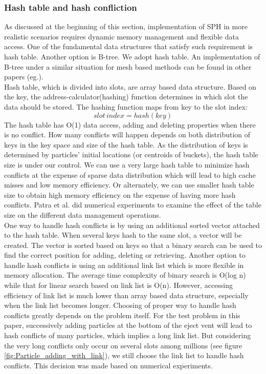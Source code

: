 \documentclass[conference,compsoc]{IEEEtran}
\begin{document}
\subsubsection{Hash table and hash confliction}
As discussed at the beginning of this section, implementation of SPH in more realistic scenarios requires dynamic memory management and flexible data access. One of the fundamental data structures that satisfy such requirement is hash table. Another option is B-tree. We adopt hash table. An implementation of B-tree under a similar situation for mesh based methods can be found in other papers (eg.\cite{patra2003data}).\\
Hash table, which is divided into slots, are array based data structure. Based on the key, the address-calculator(hashing) function determines in which slot the data should be stored. The hashing function maps from key to the slot index:
\begin{equation}
slot\,index = hash(key)
\end{equation}
The hash table has O(1) data access, adding and deleting properties when there is no conflict. How many conflicts will happen depends on both distribution of keys in the key space and size of the hash table. As the distribution of keys is determined by particles' initial locations (or centroids of buckets), the hash table size is under our control. We can use a very large hash table to minimize hash conflicts at the expense of sparse data distribution which will lead to high cache misses and low memory efficiency. Or alternately, we can use smaller hash table size to obtain high memory efficiency on the expense of having more hash conflicts. Patra et al.\cite{patra2003data} did numerical experiments to examine
the effect of the table size on the different data management operations.\\
One way to handle hash conflicts is by using an additional sorted vector attached to the hash table. When several keys hash to the same slot, a vector will be created. The vector is sorted based on keys so that a binary search can be used to find the correct position for adding, deleting or retrieving. Another option to handle hash conflicts is using an additional link list which is more flexible in memory allocation. The average time complexity of binary search is O(log n) while that for linear search based on link list is O(n). However, accessing efficiency of link list is much lower than array based data structure, especially when the link list becomes longer. Choosing of proper way to handle hash conflicts greatly depends on the problem itself. For the test problem in this paper, successively adding particles at the bottom of the eject vent will lead to hash conflicts of many particles, which implies a long link list. But considering the very long conflicts only occur on several slots among millions (see figure \ref{fig:Particle_adding_with_link}), we still choose the link list to handle hash conflicts. This decision was made based on numerical experiments.
\end{document}
